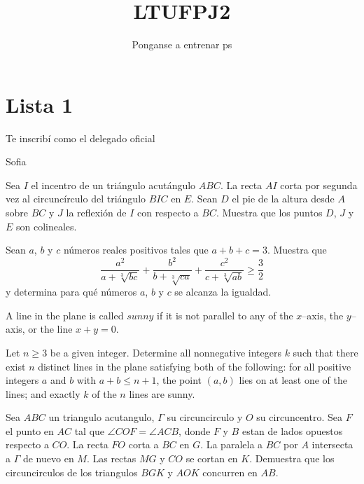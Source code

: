 \documentclass[11pt]{scrartcl}
\title {LTUFPJ2}
\subtitle {Ponganse a entrenar ps }
\author{ }
\newcommand{\thmdifficulty}{0}
\newcommand{\problemdiff}[1]{\renewcommand{\thmdifficulty}{#1}}
\begin{document}
\maketitle

\section{Lista 1}

\epigraph{Te inscribí como el delegado oficial}{ Sofia }


\problemdiff{5}
\begin{problema} [OMM 2015/5]

    Sea $I$ el incentro de un triángulo acutángulo $ABC$. La recta $AI$ corta por segunda vez al
circuncírculo del triángulo $BIC$ en $E$. Sean $D$ el pie de la altura desde $A$ sobre $BC$ y $J$
la reflexión de $I$ con respecto a $BC$. Muestra que los puntos $D$, $J$ y $E$ son colineales.
    
\end{problema}

\problemdiff{4}
\begin{problema} [OMM 2014/5]

    Sean $a$, $b$ y $c$ números reales positivos tales que $a + b + c = 3$. Muestra que 
\[ \frac{a^2}{a + \sqrt[3]{bc}} + \frac{b^2}{b + \sqrt[3]{ca}} + \frac{c^2}{c + \sqrt[3]{ab}} \geq \frac{3}{2} \]
y determina para qué números $a$, $b$ y $c$ se alcanza la igualdad.
    
\end{problema}

\problemdiff{5}
\begin{problema} [IMO 2025/1]
A line in the plane is called $sunny$ if it is not parallel to any of the $x$–axis, the $y$–axis, or the line $x+y=0$.

Let $n\ge3$ be a given integer. Determine all nonnegative integers $k$ such that there exist $n$ distinct lines in the plane satisfying both of the following:
for all positive integers $a$ and $b$ with $a+b\le n+1$, the point $(a,b)$ lies on at least one of the lines; and
exactly $k$ of the $n$ lines are sunny.
\end{problema}


\begin{problem} %
        Sea $ABC$ un triangulo acutangulo, $\Gamma$ su circuncirculo y $O$ su circuncentro. Sea $F$ el punto en $AC$ tal que $\angle COF=\angle ACB$, donde $F$ y $B$ estan de lados opuestos respecto a $CO$. La recta $FO$ corta a $BC$ en $G$. La paralela a $BC$ por $A$ intersecta a $\Gamma$ de nuevo en $M$. Las rectas $MG$ y $CO$ se cortan en $K$. Demuestra que los circuncirculos de los triangulos $BGK$ y $AOK$ concurren en $AB$.
\end{problem}
\end{document}
